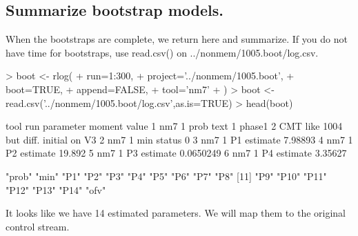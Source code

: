 \subsection{Summarize bootstrap models.}
When the bootstraps are complete, we return here and summarize. If you 
do not have time for bootstraps, use read.csv() on ../nonmem/1005.boot/log.csv.
\begin{Schunk}
\begin{Sinput}
> boot <- rlog(
+ 	run=1:300,
+ 	project='../nonmem/1005.boot',
+ 	boot=TRUE,
+ 	append=FALSE,
+ 	tool='nm7'
+ )
> boot <- read.csv('../nonmem/1005.boot/log.csv',as.is=TRUE) 
> head(boot)
\end{Sinput}
\begin{Soutput}
  tool run parameter   moment                                            value
1  nm7   1      prob     text 1 phase1 2 CMT like 1004 but diff. initial on V3
2  nm7   1       min   status                                                0
3  nm7   1        P1 estimate                                          7.98893
4  nm7   1        P2 estimate                                           19.892
5  nm7   1        P3 estimate                                        0.0650249
6  nm7   1        P4 estimate                                          3.35627
\end{Soutput}
\begin{Soutput}
 [1] "prob" "min"  "P1"   "P2"   "P3"   "P4"   "P5"   "P6"   "P7"   "P8"  
[11] "P9"   "P10"  "P11"  "P12"  "P13"  "P14"  "ofv" 
\end{Soutput}
\end{Schunk}
It looks like we have 14 estimated parameters.  We will map them to the
original control stream.
